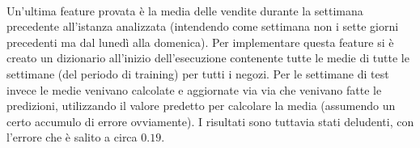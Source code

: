 \\
Un'ultima feature provata è la media delle vendite durante la settimana precedente all'istanza analizzata (intendendo come settimana non i sette giorni precedenti ma dal lunedì alla domenica). Per implementare questa feature si è creato un dizionario all'inizio dell'esecuzione contenente tutte le medie di tutte le settimane (del periodo di training) per tutti i negozi. Per le settimane di test invece le medie venivano calcolate e aggiornate via via che venivano fatte le predizioni, utilizzando il valore predetto per calcolare la media (assumendo un certo accumulo di errore ovviamente). I risultati sono tuttavia stati deludenti, con l'errore che è salito a circa $0.19$.
